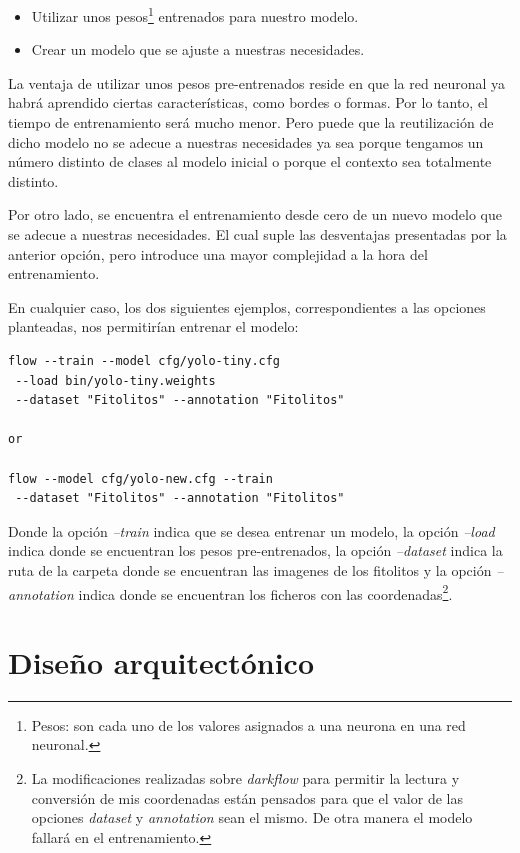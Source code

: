 \begin{itemize}
	\item Utilizar unos pesos\footnote{Pesos: son cada uno de los valores asignados a una neurona en una red neuronal.} entrenados para nuestro modelo.
	\item Crear un modelo que se ajuste a nuestras necesidades.
\end{itemize}

La ventaja de utilizar unos pesos pre-entrenados reside en que la red neuronal ya habrá aprendido ciertas características, como bordes o formas. Por lo tanto, el tiempo de entrenamiento será mucho menor. Pero puede que la reutilización de dicho modelo no se adecue a nuestras necesidades ya sea porque tengamos un número distinto de clases al modelo inicial o porque el contexto sea totalmente distinto.

Por otro lado, se encuentra el entrenamiento desde cero de un nuevo modelo que se adecue a nuestras necesidades. El cual suple las desventajas presentadas por la anterior opción, pero introduce una mayor complejidad a la hora del entrenamiento.

En cualquier caso, los dos siguientes ejemplos, correspondientes a las opciones planteadas, nos permitirían entrenar el modelo:

\begin{verbatim}
flow --train --model cfg/yolo-tiny.cfg
 --load bin/yolo-tiny.weights
 --dataset "Fitolitos" --annotation "Fitolitos"

or

flow --model cfg/yolo-new.cfg --train
 --dataset "Fitolitos" --annotation "Fitolitos"
\end{verbatim}

Donde la opción \textit{--train} indica que se desea entrenar un modelo, la opción \textit{--load} indica donde se encuentran los pesos pre-entrenados, la opción \textit{--dataset} indica la ruta de la carpeta donde se encuentran las imagenes de los fitolitos y la opción \textit{--annotation} indica donde se encuentran los ficheros con las coordenadas\footnote{La modificaciones realizadas sobre \textit{darkflow} para permitir la lectura y conversión de mis coordenadas están pensados para que el valor de las opciones \textit{dataset} y \textit{annotation} sean el mismo. De otra manera el modelo fallará en el entrenamiento.}. 

\section{Diseño arquitectónico}

